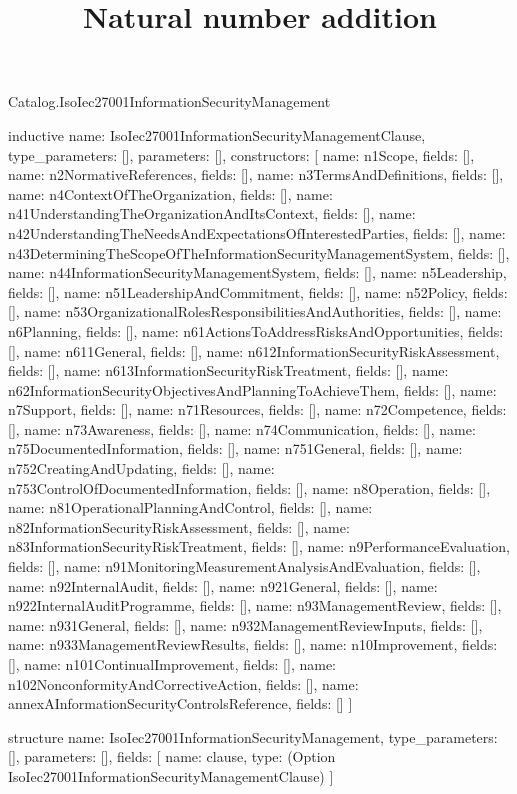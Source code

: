 \begin{lexlean}{Catalog.IsoIec27001InformationSecurityManagement}
\title{Natural number addition}
\begin{semanticmodule}
inductive{
  name: IsoIec27001InformationSecurityManagementClause,
  type_parameters: [],
  parameters: [],
  constructors: [
    {name: n1Scope, fields: []},
    {name: n2NormativeReferences, fields: []},
    {name: n3TermsAndDefinitions, fields: []},
    {name: n4ContextOfTheOrganization, fields: []},
    {name: n41UnderstandingTheOrganizationAndItsContext, fields: []},
    {name: n42UnderstandingTheNeedsAndExpectationsOfInterestedParties, fields: []},
    {name: n43DeterminingTheScopeOfTheInformationSecurityManagementSystem, fields: []},
    {name: n44InformationSecurityManagementSystem, fields: []},
    {name: n5Leadership, fields: []},
    {name: n51LeadershipAndCommitment, fields: []},
    {name: n52Policy, fields: []},
    {name: n53OrganizationalRolesResponsibilitiesAndAuthorities, fields: []},
    {name: n6Planning, fields: []},
    {name: n61ActionsToAddressRisksAndOpportunities, fields: []},
    {name: n611General, fields: []},
    {name: n612InformationSecurityRiskAssessment, fields: []},
    {name: n613InformationSecurityRiskTreatment, fields: []},
    {name: n62InformationSecurityObjectivesAndPlanningToAchieveThem, fields: []},
    {name: n7Support, fields: []},
    {name: n71Resources, fields: []},
    {name: n72Competence, fields: []},
    {name: n73Awareness, fields: []},
    {name: n74Communication, fields: []},
    {name: n75DocumentedInformation, fields: []},
    {name: n751General, fields: []},
    {name: n752CreatingAndUpdating, fields: []},
    {name: n753ControlOfDocumentedInformation, fields: []},
    {name: n8Operation, fields: []},
    {name: n81OperationalPlanningAndControl, fields: []},
    {name: n82InformationSecurityRiskAssessment, fields: []},
    {name: n83InformationSecurityRiskTreatment, fields: []},
    {name: n9PerformanceEvaluation, fields: []},
    {name: n91MonitoringMeasurementAnalysisAndEvaluation, fields: []},
    {name: n92InternalAudit, fields: []},
    {name: n921General, fields: []},
    {name: n922InternalAuditProgramme, fields: []},
    {name: n93ManagementReview, fields: []},
    {name: n931General, fields: []},
    {name: n932ManagementReviewInputs, fields: []},
    {name: n933ManagementReviewResults, fields: []},
    {name: n10Improvement, fields: []},
    {name: n101ContinualImprovement, fields: []},
    {name: n102NonconformityAndCorrectiveAction, fields: []},
    {name: annexAInformationSecurityControlsReference, fields: []}
  ]
}

structure{
  name: IsoIec27001InformationSecurityManagement,
  type_parameters: [],
  parameters: [],
  fields: [
    {name: clause, type: (Option IsoIec27001InformationSecurityManagementClause)}
  ]
}
\end{semanticmodule}
\end{lexlean}
